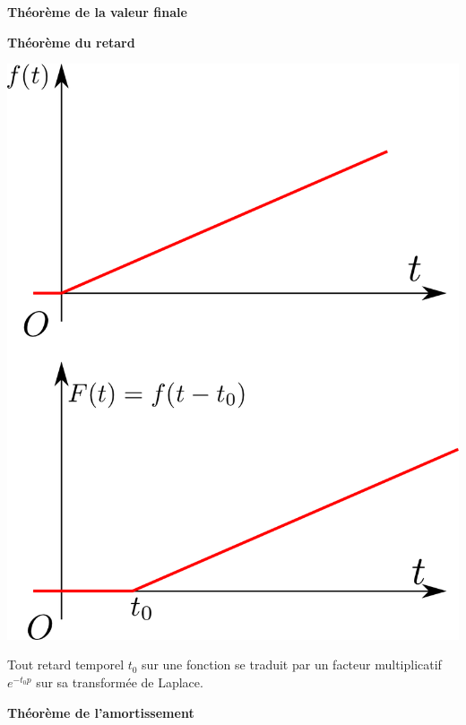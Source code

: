 \documentclass[11pt,oneside]{article}
\begin{document}
\begin{theo}
\textbf{Théorème de la valeur finale}

\end{theo}

\begin{minipage}[c]{.6\linewidth}
\begin{theo}
\textbf{Théorème du retard}

\end{theo}
\end{minipage} \hfill
\begin{minipage}[c]{.35\linewidth}

\begin{center}
 \includegraphics[width=.25\textwidth]{png/retard}
\end{center}
\end{minipage}

Tout retard temporel $t_0$ sur une fonction se traduit par un facteur
multiplicatif $e^{-t_0 p}$ sur sa transformée de Laplace.


\begin{minipage}[c]{.6\linewidth}
\begin{theo}
\textbf{Théorème de l'amortissement}

\end{theo}
\end{minipage} \hfill
\begin{minipage}[c]{.35\linewidth}
\end{minipage}
\end{document}
